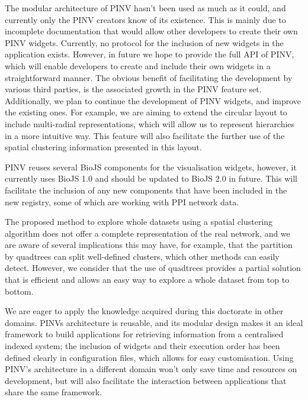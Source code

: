 The modular architecture of PINV hasn't been used as much as it could, and currently only the PINV creators know of its existence. This is mainly due to incomplete documentation that would allow other developers to create their own PINV widgets. Currently, no protocol for the inclusion of new widgets in the application exists. However, in future we hope to provide the full API of PINV, which will enable developers to create and include their own widgets in a straightforward manner.  The obvious benefit of facilitating the development by various third parties, is the associated growth in the PINV feature set. Additionally, we plan to continue the development of PINV widgets, and improve the existing ones.  For example, we are aiming to extend the circular layout to include multi-radial representations, which will allow us to represent hierarchies in a more intuitive way. This feature will also facilitate the further use of the spatial clustering information presented in this layout.

PINV reuses several BioJS components for the visualisation widgets, however, it currently uses BioJS 1.0 and should be updated to BioJS 2.0 in future. This will facilitate the inclusion of any new components that have been included in the new registry, some of which are working with PPI network data.

The proposed method to explore whole datasets using a spatial clustering algorithm does not offer a complete representation of the real network, and we are aware of several implications this may have, for example, that the partition by quadtrees can split well-defined clusters, which other methods can easily detect. However, we consider that the use of quadtrees provides a partial solution that is efficient and allows an easy way to explore a whole dataset from top to bottom.

We are eager to apply the knowledge acquired during this doctorate in other domains. PINVs architecture is reusable, and its modular design makes it an ideal framework to build applications for retrieving information from a centralised indexed system; the inclusion of widgets and their execution order has been defined clearly in configuration files, which allows for easy customisation. Using PINV's architecture in a different domain won't only save time and resources on development, but will also facilitate the interaction between applications that share the same framework.

\vspace{5mm}


